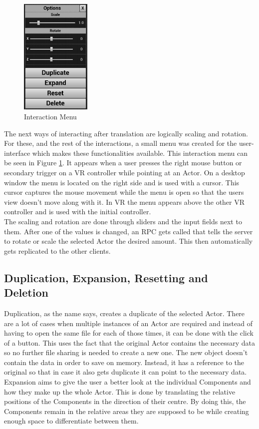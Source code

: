 \begin{figure}
	\centering
	\includegraphics[width=0.30\textwidth]{fig/InteractionMenu2.png}
	\caption[Interaction Menu instead of UI Editor]{Interaction Menu}
	\label{fig:InteractionMenu}
\end{figure}

The next ways of interacting after translation are logically scaling and rotation. For these, and the rest of the interactions, a small menu was created for the user-interface which makes these functionalities available. This interaction menu can be seen in Figure \ref{fig:InteractionMenu}. It appears when a user presses the right mouse button or secondary trigger on a \acs{VR} controller while pointing at an Actor. On a desktop window the menu is located on the right side and is used with a cursor. This cursor captures the mouse movement while the menu is open so that the users view doesn't move along with it. In \acs{VR} the menu appears above the other VR controller and is used with the initial controller.\\
The scaling and rotation are done through sliders and the input fields next to them. After one of the values is changed, an \acs{RPC} gets called that tells the server to rotate or scale the selected Actor the desired amount. This then automatically gets replicated to the other clients.

\subsection{Duplication, Expansion, Resetting and Deletion}

Duplication, as the name says, creates a duplicate of the selected Actor. There are a lot of cases when multiple instances of an Actor are required and instead of having to open the same file for each of those times, it can be done with the click of a button. This uses the fact that the original Actor contains the necessary data so no further file sharing is needed to create a new one. The new object doesn't contain the data in order to save on memory. Instead, it has a reference to the original so that in case it also gets duplicate it can point to the necessary data.\\
Expansion aims to give the user a better look at the individual Components and how they make up the whole Actor. This is done by translating the relative positions of the Components in the direction of their centre. By doing this, the Components remain in the relative areas they are supposed to be while creating enough space to differentiate between them.

